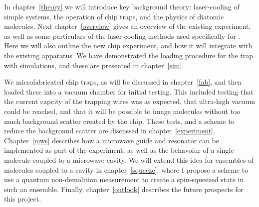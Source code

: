 In chapter~\ref{theory} we will introduce key background theory: 
laser-cooling of simple systems, the operation of chip traps, and the physics
of diatomic molecules. Next chapter~\ref{overview} gives an overview of the
existing \CaF{} experiment, as well as some particulars of the laser-cooling
methods used specifically for \CaF{}. Here we will also outline the new chip
experiment, and how it will integrate with the existing apparatus. We have
demonstrated the loading procedure for the trap with simulations, and these are
presented in chapter~\ref{sim}.

We microfabricated chip traps, as will be discussed in chapter~\ref{fab}, and
then loaded these into a vacuum chamber for initial testing. This included
testing that the current capcity of the trapping wires was as expected, that
ultra-high vacuum could be reached, and that it will be possible to image
molecules without too much background scatter created by the chip. These tests,
and a scheme to reduce the background scatter are discussed in
chapter~\ref{experiment}. Chapter~\ref{mws} describes how a microwave guide and
resonator can be implemented as part of the experiment, as well as the
behavoiur of a single molecule coupled to a microwave cavity. We will extend
this idea for ensembles of molecules coupled to a cavity in
chapter~\ref{squeeze}, where I propose a scheme to use a quantum non-demolition
measurement to create a spin-squeezed state in such an ensemble. Finally,
chapter~\ref{outlook} describes the future prospects for this project.
